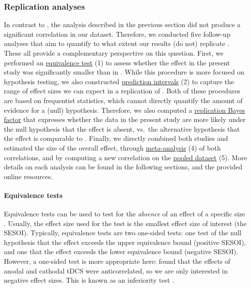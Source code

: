 \documentclass[11pt,]{memoir}
\let\oldparagraph\paragraph
\renewcommand{\paragraph}[1]{\oldparagraph{#1}\mbox{}}
\begin{document}
\hypertarget{AB_tDCS-rep-analyses}{%
\subsubsection{Replication analyses}\label{AB_tDCS-rep-analyses}}

In contrast to \textcite{London2015}, the analysis described in the previous section did not produce a significant correlation in our dataset. Therefore, we conducted five follow-up analyses that aim to quantify to what extent our results (do not) replicate \textcite{London2015}. These all provide a complementary perspective on this question. First, we performed an \protect\hyperlink{eq}{equivalence test} (1) to assess whether the effect in the present study was significantly smaller than in \textcite{London2015}. While this procedure is more focused on hypothesis testing, we also constructed \protect\hyperlink{pi}{prediction intervals} (2) to capture the range of effect sizes we can expect in a replication of \textcite{London2015}. Both of these procedures are based on frequentist statistics, which cannot directly quantify the amount of evidence for a (null) hypothesis. Therefore, we also computed a \protect\hyperlink{repBF}{replication Bayes factor} that expresses whether the data in the present study are more likely under the null hypothesis that the effect is absent, vs.~the alternative hypothesis that the effect is comparable to \textcite{London2015}. Finally, we directly combined both studies and estimated the size of the overall effect, through \protect\hyperlink{meta}{meta-analysis} (4) of both correlations, and by computing a new correlation on the \protect\hyperlink{pool}{pooled dataset} (5). More details on each analysis can be found in the following sections, and the provided online resources.

\hypertarget{eq}{%
\paragraph{Equivalence tests}\label{eq}}

Equivalence tests can be used to test for the \emph{absence} of an effect of a specific size \autocite[see][ for a tutorial]{Lakens2018}. Usually, the effect size used for the test is the smallest effect size of interest (the SESOI). Typically, equivalence tests are two one-sided tests: one test of the null hypothesis that the effect exceeds the upper equivalence bound (positive SESOI), and one that the effect exceeds the lower equivalence bound (negative SESOI). However, a one-sided test is more appropriate here: \textcite{London2015} found that the effects of anodal and cathodal tDCS were anticorrelated, so we are only interested in negative effect sizes. This is known as an inferiority test \autocite{Lakens2018}.
\end{document}
